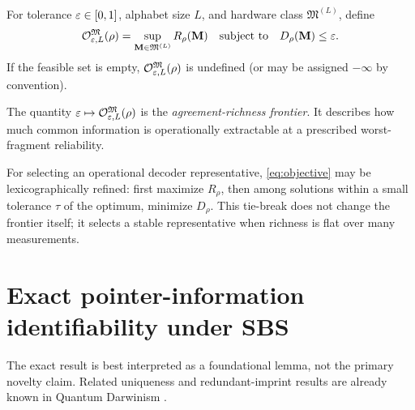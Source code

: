 \begin{definition}
For tolerance $\varepsilon\in[0,1]$, alphabet size $L$, and hardware class $\mathfrak M^{(L)}$, define
\begin{equation}
\mathcal O_{\varepsilon,L}^{\mathfrak M}(\rho)
=
\sup_{\mathbf M\in\mathfrak M^{(L)}}R_\rho(\mathbf M)
\quad\text{subject to}\quad
D_\rho(\mathbf M)\le \varepsilon.
\label{eq:objective}
\end{equation}
If the feasible set is empty, $\mathcal O_{\varepsilon,L}^{\mathfrak M}(\rho)$ is undefined (or may be assigned $-\infty$ by convention).
\end{definition}

The quantity $\varepsilon\mapsto\mathcal O_{\varepsilon,L}^{\mathfrak M}(\rho)$ is the \emph{agreement-richness frontier}. It describes how much common information is operationally extractable at a prescribed worst-fragment reliability.

For selecting an operational decoder representative, \cref{eq:objective} may be lexicographically refined: first maximize $R_\rho$, then among solutions within a small tolerance $\tau$ of the optimum, minimize $D_\rho$. This tie-break does not change the frontier itself; it selects a stable representative when richness is flat over many measurements.

\section{Exact pointer-information identifiability under SBS}

The exact result is best interpreted as a foundational lemma, not the primary novelty claim. Related uniqueness and redundant-imprint results are already known in Quantum Darwinism \cite{ollivier2004,fu2021}.


